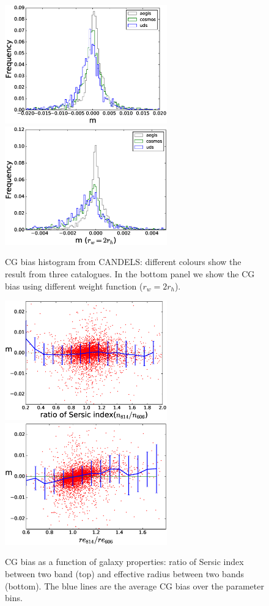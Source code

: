 \documentclass[useAMS,usenatbib]{mnras}
\begin{document}
%
\begin{figure}
  \includegraphics[width=7.0cm]{zhiscgb.eps}
  \includegraphics[width=7.0cm]{zhiscgbno.eps}
\caption{CG bias histogram from CANDELS: different colours show the
  result from three catalogues. In the bottom panel we show the CG
  bias using different weight function ($r_w = 2r_h$).  }
\label{fig:cgbhis}
\end{figure}
%
%
\begin{figure}
\includegraphics[width=7.0cm]{zcgb-ne17.eps}
\includegraphics[width=7.0cm]{zcgb-re17.eps}
\caption{CG bias as a function of galaxy properties: ratio of Sersic
  index between two band (top) and effective radius between two bands
  (bottom). The blue lines are the average CG bias over the parameter
  bins.}
\label{fig:cg2fitpar}
\end{figure}
\end{document}
